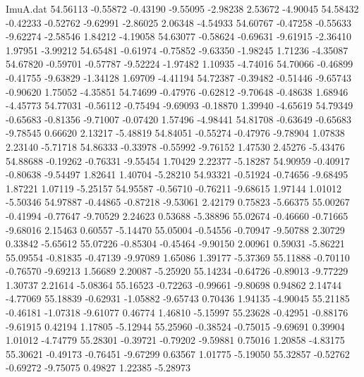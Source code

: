 \begin{filecontents}{ImuA.dat}
  54.56113   -0.55872   -0.43190   -9.55095   -2.98238    2.53672   -4.90045
  54.58432   -0.42233   -0.52762   -9.62991   -2.86025    2.06348   -4.54933
  54.60767   -0.47258   -0.55633   -9.62274   -2.58546    1.84212   -4.19058
  54.63077   -0.58624   -0.69631   -9.61915   -2.36410    1.97951   -3.99212
  54.65481   -0.61974   -0.75852   -9.63350   -1.98245    1.71236   -4.35087
  54.67820   -0.59701   -0.57787   -9.52224   -1.97482    1.10935   -4.74016
  54.70066   -0.46899   -0.41755   -9.63829   -1.34128    1.69709   -4.41194
  54.72387   -0.39482   -0.51446   -9.65743   -0.90620    1.75052   -4.35851
  54.74699   -0.47976   -0.62812   -9.70648   -0.48638    1.68946   -4.45773
  54.77031   -0.56112   -0.75494   -9.69093   -0.18870    1.39940   -4.65619
  54.79349   -0.65683   -0.81356   -9.71007   -0.07420    1.57496   -4.98441
  54.81708   -0.63649   -0.65683   -9.78545    0.66620    2.13217   -5.48819
  54.84051   -0.55274   -0.47976   -9.78904    1.07838    2.23140   -5.71718
  54.86333   -0.33978   -0.55992   -9.76152    1.47530    2.45276   -5.43476
  54.88688   -0.19262   -0.76331   -9.55454    1.70429    2.22377   -5.18287
  54.90959   -0.40917   -0.80638   -9.54497    1.82641    1.40704   -5.28210
  54.93321   -0.51924   -0.74656   -9.68495    1.87221    1.07119   -5.25157
  54.95587   -0.56710   -0.76211   -9.68615    1.97144    1.01012   -5.50346
  54.97887   -0.44865   -0.87218   -9.53061    2.42179    0.75823   -5.66375
  55.00267   -0.41994   -0.77647   -9.70529    2.24623    0.53688   -5.38896
  55.02674   -0.46660   -0.71665   -9.68016    2.15463    0.60557   -5.14470
  55.05004   -0.54556   -0.70947   -9.50788    2.30729    0.33842   -5.65612
  55.07226   -0.85304   -0.45464   -9.90150    2.00961    0.59031   -5.86221
  55.09554   -0.81835   -0.47139   -9.97089    1.65086    1.39177   -5.37369
  55.11888   -0.70110   -0.76570   -9.69213    1.56689    2.20087   -5.25920
  55.14234   -0.64726   -0.89013   -9.77229    1.30737    2.21614   -5.08364
  55.16523   -0.72263   -0.99661   -9.80698    0.94862    2.14744   -4.77069
  55.18839   -0.62931   -1.05882   -9.65743    0.70436    1.94135   -4.90045
  55.21185   -0.46181   -1.07318   -9.61077    0.46774    1.46810   -5.15997
  55.23628   -0.42951   -0.88176   -9.61915    0.42194    1.17805   -5.12944
  55.25960   -0.38524   -0.75015   -9.69691    0.39904    1.01012   -4.74779
  55.28301   -0.39721   -0.79202   -9.59881    0.75016    1.20858   -4.83175
  55.30621   -0.49173   -0.76451   -9.67299    0.63567    1.01775   -5.19050
  55.32857   -0.52762   -0.69272   -9.75075    0.49827    1.22385   -5.28973

\end{filecontents}
